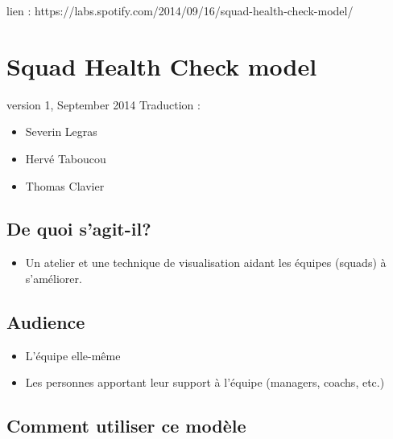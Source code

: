\documentclass[a4paper]{article}
\begin{document}
lien : https://labs.spotify.com/2014/09/16/squad-health-check-model/


\section{Squad Health Check model}

version 1, September 2014
Traduction : 
\begin{itemize}
\item Severin Legras
\item Hervé Taboucou
\item Thomas Clavier
\end{itemize}

\subsection{De quoi s'agit-il?}

\begin{itemize}
\item Un atelier et une technique de visualisation aidant les équipes (squads) à s'améliorer.
\end{itemize}

\subsection{Audience}

\begin{itemize}
\item L'équipe elle-même
\item Les personnes apportant leur support à l'équipe (managers, coachs, etc.)
\end{itemize}

\subsection{Comment utiliser ce modèle}
\end{document}
